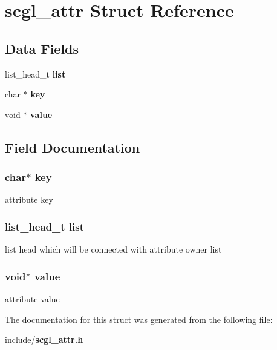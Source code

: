 \section{scgl\-\_\-attr Struct Reference}
\label{structscgl__attr}
\subsection*{Data Fields}
\begin{DoxyCompactItemize}
\item 
list\-\_\-head\-\_\-t {\bf list}
\item 
char $\ast$ {\bf key}
\item 
void $\ast$ {\bf value}
\end{DoxyCompactItemize}


\subsection{Field Documentation}
\subsubsection[{key}]{\setlength{\rightskip}{0pt plus 5cm}char$\ast$ {\bf key}}\label{structscgl__attr_a5892a9181e6a332f84d27aecd41dcd12}
attribute key 
\subsubsection[{list}]{\setlength{\rightskip}{0pt plus 5cm}list\-\_\-head\-\_\-t {\bf list}}\label{structscgl__attr_ab89c0e6c86f3940d2bb4bb87d1a25710}
list head which will be connected with attribute owner list 
\subsubsection[{value}]{\setlength{\rightskip}{0pt plus 5cm}void$\ast$ {\bf value}}\label{structscgl__attr_a0f61d63b009d0880a89c843bd50d8d76}
attribute value 

The documentation for this struct was generated from the following file\-:\begin{DoxyCompactItemize}
\item 
include/{\bf scgl\-\_\-attr.\-h}\end{DoxyCompactItemize}
